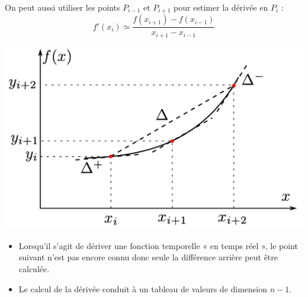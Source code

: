 \documentclass[10pt]{article}
\begin{document}
\begin{minipage}[c]{.49\linewidth}
\begin{resultat}

On peut aussi utiliser les points $P_{i-1}$ et $P_{i+1}$ pour estimer la dérivée en $P_i$ :
$$
f'(x_i)\simeq\dfrac{f(x_{i+1})-f(x_{i-1})}{x_{i+1}-x_{i-1}}
$$

\end{resultat}
\end{minipage}\hfill
\begin{minipage}[c]{.49\linewidth}
\begin{center}
\includegraphics[width=\textwidth]{images/derivation_2pas}
\end{center}
\end{minipage}

\begin{rem}
\begin{itemize}
\item Lorsqu’il s’agit de dériver une fonction temporelle « en temps réel », le point suivant n’est pas encore connu donc seule la différence arrière peut être calculée.
\item Le calcul de la dérivée conduit à un tableau de valeurs de dimension $n-1$.
\end{itemize}
\end{rem}



\begin{thebibliography}{2}
\end{thebibliography}
\end{document}
